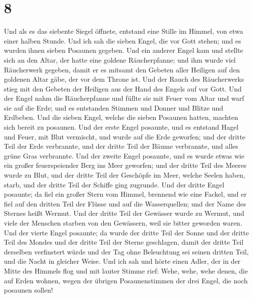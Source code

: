 \hypertarget{section-7}{%
\section{8}\label{section-7}}

 Und als es das siebente Siegel öffnete, entstand eine
Stille im Himmel, von etwa einer halben Stunde.  Und ich
sah die sieben Engel, die vor Gott stehen; und es wurden ihnen sieben
Posaunen gegeben.  Und ein anderer Engel kam und stellte
sich an den Altar, der hatte eine goldene Räucherpfanne; und ihm wurde
viel Räucherwerk gegeben, damit er es mitsamt den Gebeten aller Heiligen
auf den goldenen Altar gäbe, der vor dem Throne ist.  Und
der Rauch des Räucherwerks stieg mit den Gebeten der Heiligen aus der
Hand des Engels auf vor Gott.  Und der Engel nahm die
Räucherpfanne und füllte sie mit Feuer vom Altar und warf sie auf die
Erde; und es entstanden Stimmen und Donner und Blitze und Erdbeben.
 Und die sieben Engel, welche die sieben Posaunen hatten,
machten sich bereit zu posaunen.  Und der erste Engel
posaunte, und es entstand Hagel und Feuer, mit Blut vermischt, und wurde
auf die Erde geworfen; und der dritte Teil der Erde verbrannte, und der
dritte Teil der Bäume verbrannte, und alles grüne Gras verbrannte.
 Und der zweite Engel posaunte, und es wurde etwas wie ein
großer feuerspeiender Berg ins Meer geworfen; und der dritte Teil des
Meeres wurde zu Blut,  und der dritte Teil der Geschöpfe
im Meer, welche Seelen haben, starb, und der dritte Teil der Schiffe
ging zugrunde.  Und der dritte Engel posaunte; da fiel
ein großer Stern vom Himmel, brennend wie eine Fackel, und er fiel auf
den dritten Teil der Flüsse und auf die Wasserquellen; 
und der Name des Sternes heißt Wermut. Und der dritte Teil der Gewässer
wurde zu Wermut, und viele der Menschen starben von den Gewässern, weil
sie bitter geworden waren.  Und der vierte Engel
posaunte; da wurde der dritte Teil der Sonne und der dritte Teil des
Mondes und der dritte Teil der Sterne geschlagen, damit der dritte Teil
derselben verfinstert würde und der Tag ohne Beleuchtung sei seinen
dritten Teil, und die Nacht in gleicher Weise.  Und ich
sah und hörte einen Adler, der in der Mitte des Himmels flog und mit
lauter Stimme rief: Wehe, wehe, wehe denen, die auf Erden wohnen, wegen
der übrigen Posaunenstimmen der drei Engel, die noch posaunen sollen!

